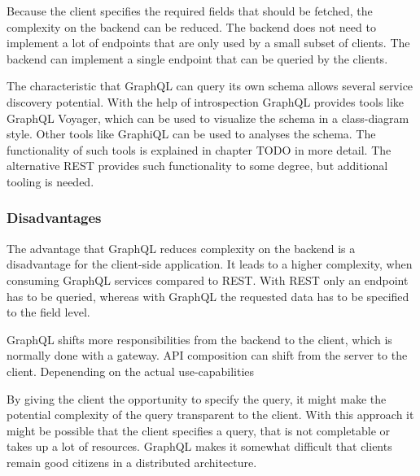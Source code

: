 Because the client specifies the required fields that should be fetched, the complexity on the backend can be reduced. The backend does not need to implement a lot of endpoints that are only used by a small subset of clients. The backend can implement a single endpoint that can be queried by the clients.


The characteristic that GraphQL can query its own schema allows several service discovery potential. With the help of introspection GraphQL provides tools like GraphQL Voyager, which can be used to visualize the schema in a class-diagram style. Other tools like GraphiQL can be used to analyses the schema. The functionality of such tools is explained in chapter TODO in more detail. The alternative REST provides such functionality to some degree, but additional tooling is needed.


\subsubsection{Disadvantages}

The advantage that GraphQL reduces complexity on the backend is a disadvantage for the client-side application. It leads to a higher complexity, when consuming GraphQL services compared to REST. With REST only an endpoint has to be queried, whereas with GraphQL the requested data has to be specified to the field level. %

GraphQL shifts more responsibilities from the backend to the client, which is normally done with a gateway. API composition can shift from the server to the client. Depenending on the actual use-capabilities

By giving the client the opportunity to specify the query, it might make the potential complexity of the query transparent to the client. With this approach it might be possible that the client specifies a query, that is not completable or takes up a lot of resources. GraphQL makes it somewhat difficult that clients remain good citizens in a distributed architecture. \cite{book:2018:richardson:background:bff:microservices-patterns}





